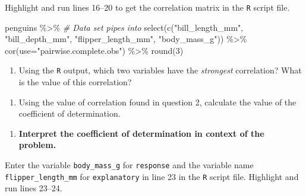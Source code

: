 \documentclass[
]{report}
\newenvironment{Shaded}{\begin{snugshade}}{\end{snugshade}}
\newcommand{\AttributeTok}[1]{\textcolor[rgb]{0.77,0.63,0.00}{#1}}
\newcommand{\CommentTok}[1]{\textcolor[rgb]{0.56,0.35,0.01}{\textit{#1}}}
\newcommand{\DecValTok}[1]{\textcolor[rgb]{0.00,0.00,0.81}{#1}}
\newcommand{\FunctionTok}[1]{\textcolor[rgb]{0.00,0.00,0.00}{#1}}
\newcommand{\NormalTok}[1]{#1}
\newcommand{\SpecialCharTok}[1]{\textcolor[rgb]{0.00,0.00,0.00}{#1}}
\newcommand{\StringTok}[1]{\textcolor[rgb]{0.31,0.60,0.02}{#1}}
\providecommand{\tightlist}{%
  \setlength{\itemsep}{0pt}\setlength{\parskip}{0pt}}
\begin{document}
\vspace{.1in}

Highlight and run lines 16--20 to get the correlation matrix in the \texttt{R} script file.

\begin{Shaded}
\begin{Highlighting}[]
\NormalTok{penguins }\SpecialCharTok{\%\textgreater{}\%}  \CommentTok{\# Data set pipes into}
  \FunctionTok{select}\NormalTok{(}\FunctionTok{c}\NormalTok{(}\StringTok{"bill\_length\_mm"}\NormalTok{, }\StringTok{"bill\_depth\_mm"}\NormalTok{, }
           \StringTok{"flipper\_length\_mm"}\NormalTok{, }\StringTok{"body\_mass\_g"}\NormalTok{)) }\SpecialCharTok{\%\textgreater{}\%}
  \FunctionTok{cor}\NormalTok{(}\AttributeTok{use=}\StringTok{"pairwise.complete.obs"}\NormalTok{) }\SpecialCharTok{\%\textgreater{}\%}
  \FunctionTok{round}\NormalTok{(}\DecValTok{3}\NormalTok{)}
\end{Highlighting}
\end{Shaded}

\begin{enumerate}
\def\labelenumi{\arabic{enumi}.}
\setcounter{enumi}{1}
\tightlist
\item
  Using the \texttt{R} output, which two variables have the \emph{strongest} correlation? What is the value of this correlation?
\end{enumerate}

\vspace{0.5in}

\begin{enumerate}
\def\labelenumi{\arabic{enumi}.}
\setcounter{enumi}{2}
\tightlist
\item
  Using the value of correlation found in question 2, calculate the value of the coefficient of determination.
\end{enumerate}

\vspace{0.5in}

\begin{enumerate}
\def\labelenumi{\arabic{enumi}.}
\setcounter{enumi}{3}
\tightlist
\item
  \textbf{Interpret the coefficient of determination in context of the problem.}
\end{enumerate}

\vspace{1in}

Enter the variable \texttt{body\_mass\_g} for \texttt{response} and the variable name \texttt{flipper\_length\_mm} for \texttt{explanatory} in line 23 in the \texttt{R} script file. Highlight and run lines 23--24.
\end{document}

